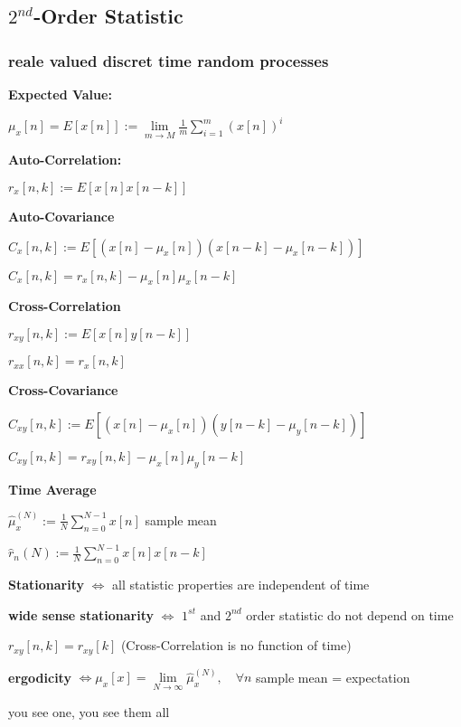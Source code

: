 \newpage
\subsection{\texorpdfstring{$2^{nd}$}{Second}-Order Statistic}

\subsubsection{reale valued discret time random processes}
\textbf{Expected Value:}

\quad $\mu_x[n]=E[x[n]]:= \lim\limits_{m\to M}\frac{1}{m}\sum\limits_{i=1}^m(x[n])^i$

\textbf{Auto-Correlation:}

\quad $r_x[n,k]:=E[x[n]x[n-k]]$

\textbf{Auto-Covariance}

\quad $C_x[n,k]:=E[(x[n]-\mu_x[n])(x[n-k]-\mu_x[n-k])]$ 

\quad $C_x[n,k]=r_x[n,k]-\mu_x[n]\mu_x[n-k]$

\textbf{Cross-Correlation}

\quad $r_{xy}[n,k]:=E[x[n]y[n-k]]$

\quad $r_{xx}[n,k]=r_x[n,k]$

\textbf{Cross-Covariance}

\quad $C_{xy}[n,k]:=E[(x[n]-\mu_x[n])(y[n-k]-\mu_y[n-k])] $

\quad $C_{xy}[n,k]=r_{xy}[n,k]-\mu_x[n]\mu_y[n-k]$

\textbf{Time Average}

\quad $\hat{\mu}_x^{(N)}:=\frac{1}{N}\sum\limits_{n=0}^{N-1}x[n]$ \qquad sample mean

\quad $\hat{r}_n{(N)}:=\frac{1}{N}\sum\limits_{n=0}^{N-1}x[n]x[n-k]$

\textbf{Stationarity} $\iff$ all statistic properties are independent of time

\textbf{wide sense stationarity} $\iff$ $1^{st}$ and $2^{nd}$ order statistic do not depend on time

\pfeil $r_{xy}[n,k]=r_{xy}[k]$ (Cross-Correlation is no function of time)

\textbf{ergodicity} $\iff \mu_x[x]=\lim\limits_{N\to\infty}\hat{\mu}_x^{(N)},\quad \forall n$ \pfeil sample mean = expectation 

\qquad you see one, you see them all 

\vspace{0.5cm}

